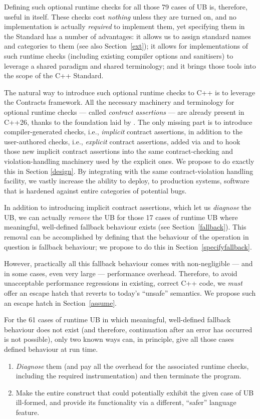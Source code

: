 Defining such optional runtime checks for all those 79 cases of UB is, therefore, useful in itself. These checks cost \emph{nothing} unless they are turned on, and no implementation is actually \emph{required} to implement them, yet specifying them in the Standard has a number of advantages: it allows us to assign standard names and categories to them (see also Section~\ref{ext}); it allows for implementations of such runtime checks (including existing compiler options and sanitisers) to leverage a shared paradigm and shared terminology; and it brings those tools into the scope of the C++ Standard.

The natural way to introduce such optional runtime checks to C++ is to leverage the Contracts framework. All the necessary machinery and terminology for optional runtime checks --- called \emph{contract assertions} --- are already present in C++26, thanks to the foundation laid by \cite{P2900R14}. The only missing part is to introduce compiler-generated checks, i.e., \emph{implicit} contract assertions, in addition to the user-authored checks, i.e., \emph{explicit} contract assertions,  added via \cite{P2900R14} and to hook those new implicit contract assertions into the same contract-checking and violation-handling machinery used by the explicit ones. We propose to do exactly this in Section \ref{design}. By integrating with the same contract-violation handling facility, we vastly increase the ability to deploy, to production systems, software that is hardened against entire categories of potential bugs.

In addition to introducing implicit contract assertions, which let us \emph{diagnose} the UB, we can actually \emph{remove} the UB for those 17 cases of runtime UB where meaningful, well-defined fallback behaviour exists (see Section~\ref{fallback}). This removal can be accomplished by defining that the behaviour of the operation in question is fallback behaviour; we propose to do this in Section~\ref{specifyfallback}.

However, practically all this fallback behaviour comes with non-negligible --- and in some cases, even very large --- performance overhead. Therefore, to avoid unacceptable performance regressions in existing, correct C++ code, we \emph{must} offer an escape hatch that reverts to today's ``unsafe'' semantics. We propose such an escape hatch in Section~\ref{assume}.

For the 61 cases of runtime UB in which meaningful, well-defined fallback behaviour does not exist (and therefore, continuation after an error has occurred is not possible), only two known ways can, in principle, give all those cases defined behaviour at run time.
\begin{enumerate}
\renewcommand{\labelenumi}{\arabic{enumi}.}
\item \emph{Diagnose} them (and pay all the overhead for the associated runtime checks, including the required instrumentation) and then terminate the program.
\item Make the entire construct that could potentially exhibit the given case of UB ill-formed, and provide its functionality via a different, ``safer'' language feature.
\end{enumerate}

